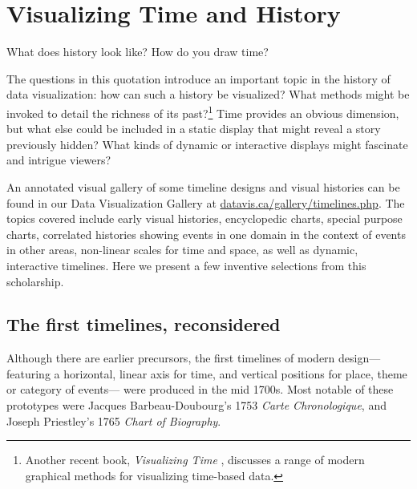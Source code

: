\section{Visualizing Time and History}\label{sec:vistime}

\epigraph{What does history look like?  How do you draw time?}{\citet[p. 10]{RosenbergGrafton:2010}}
The questions in this quotation introduce an important topic in the history of data visualization:  how can such a history be visualized? What methods might be invoked to detail the richness of its past?\footnote{Another recent book, \emph{Visualizing Time} \citep{Wills:2012}, discusses a range of  modern graphical methods for visualizing time-based data.} Time provides an obvious dimension, but what else could be included in a static display that might reveal a story previously hidden? What kinds of dynamic or interactive displays might fascinate and intrigue viewers? 

An annotated visual gallery of some timeline designs and visual histories can be found in our Data Visualization Gallery at \url{datavis.ca/gallery/timelines.php}. The topics covered include early visual histories, encyclopedic charts, special purpose charts, correlated histories showing events in one domain in the context of events in other areas, non-linear scales for time and space, as well as dynamic, interactive timelines.  Here we present a few inventive selections from this scholarship.

\subsection{The first timelines, reconsidered}
Although there are earlier precursors, the first timelines of modern design--- featuring a horizontal, linear axis for time, and vertical positions for place, theme or category of events--- were produced in the mid 1700s. Most notable of these prototypes were Jacques Barbeau-Doubourg's 1753 \emph{Carte Chronologique}, and Joseph Priestley's 1765 \emph{Chart of Biography}.

